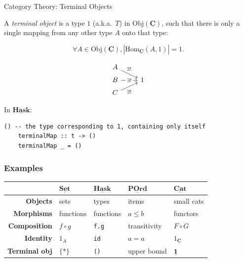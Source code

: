 \documentclass[10pt]{beamer}
\newcommand{\Cat}[1]{\ensuremath{\underline{\mathbf{#1}}}}
\newcommand{\Obj}[1]{\ensuremath{\mathrm{Obj}(\Cat{#1})}}
\newcommand{\Hom}[3]{\ensuremath{\mathrm{Hom}_{\Cat{#1}}(#2,#3)}}
\theoremstyle{definition}
\theoremstyle{remark}
\numberwithin{equation}{section}
\begin{document}
\begin{frame}[fragile]{Category Theory: Terminal Objects}

  A \emph{terminal object} is a type $1$ (a.k.a.\ $T$) in $\Obj{C}$, such that there is only a single mapping from any other type $A$ onto that type:

  \[
    \forall A\in \Obj{C}, \left| \Hom{C}{A}{1} \right| = 1.
  \]

  \[
    \begin{tikzcd}[row sep=tiny]
      A \arrow[near start]{dr}{\exists!} & \\
      B \arrow["\exists!" description]{r} & 1\\
      C \arrow[swap,near start]{ur}{\exists!} & 
    \end{tikzcd}
  \]
  

  In \Cat{Hask}:
  \begin{lstlisting}[frame=single]
    () -- the type corresponding to 1, containing only itself
    terminalMap :: t -> ()
    terminalMap _ = ()
  \end{lstlisting}

\end{frame}

\begin{frame}[fragile]
  \frametitle{Examples}

  \begin{center}
    \begin{tabular}{r l l l l}\toprule
    & $\Cat{Set}$ & $\Cat{Hask}$ & $\Cat{POrd}$ & $\Cat{Cat}$ \\\midrule
    \textbf{Objects} & sets & types & items & small cats \\
    \textbf{Morphisms} & functions & functions & $a \leq b$ & functors \\
    \textbf{Composition} & $f \circ g$ & \lstinline!f.g! & transitivity & $F \circ G$ \\
    \textbf{Identity} & $1_A$ & {\lstinline!id!} & $a = a$ & $1_{\Cat{C}}$ \\
      \textbf{Terminal obj\rlap{.}} & $\{*\}$ & \lstinline!()! & upper bound & $\Cat{1}$ \\\bottomrule
  \end{tabular}
  \end{center}
  
\end{frame}
\end{document}
